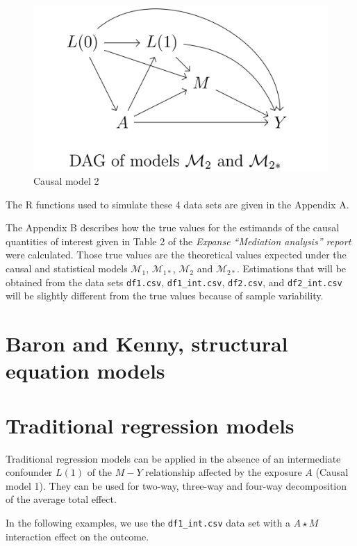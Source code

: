 \documentclass[
]{book}
\begin{document}
\begin{figure}

{\centering \includegraphics[width=0.5\linewidth]{./figures/DAG_M2} 

}

\caption{Causal model 2}\label{fig:figDAGM2}
\end{figure}

The R functions used to simulate these 4 data sets are given in the Appendix A.

The Appendix B describes how the true values for the estimands of the causal quantities of interest given in Table 2 of the \emph{Expanse ``Mediation analysis'' report} were calculated. Those true values are the theoretical values expected under the causal and statistical models \(\mathcal{M}_1\), \(\mathcal{M}_{1 \ast}\), \(\mathcal{M}_2\) and \(\mathcal{M}_{2 \ast}\). Estimations that will be obtained from the data sets \texttt{df1.csv}, \texttt{df1\_int.csv}, \texttt{df2.csv}, and \texttt{df2\_int.csv} will be slightly different from the true values because of sample variability.

\hypertarget{chap_baron_kenny_sem}{%
\chapter{Baron and Kenny, structural equation models}\label{chap_baron_kenny_sem}}

\hypertarget{chap_trad_reg_models}{%
\chapter{Traditional regression models}\label{chap_trad_reg_models}}

Traditional regression models can be applied in the absence of an intermediate confounder \(L(1)\) of the \(M-Y\) relationship affected by the exposure \(A\) (Causal model 1). They can be used for two-way, three-way and four-way decomposition of the average total effect.

In the following examples, we use the \texttt{df1\_int.csv} data set with a \(A \star M\) interaction effect on the outcome.
\end{document}

